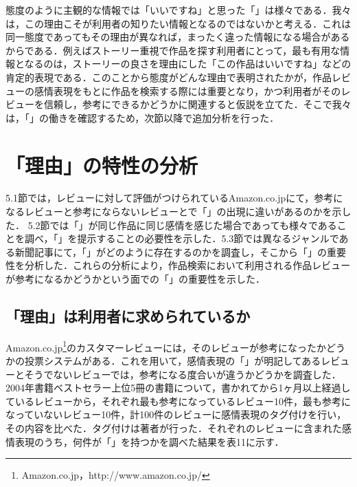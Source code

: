 \documentclass[japanese]{jnlp_1.3a}
\begin{document}
態度のように主観的な情報では「いいですね」と思った「」は様々である．我々は，この理由こそが利用者の知りたい情報となるのではないかと考える．これは同一態度であってもその理由が異なれば，まったく違った情報になる場合があるからである．例えばストーリー重視で作品を探す利用者にとって，最も有用な情報となるのは，ストーリーの良さを理由にした「この作品はいいですね」などの肯定的表現である．このことから態度がどんな理由で表明されたかが，作品レビューの感情表現をもとに作品を検索する際には重要となり，かつ利用者がそのレビューを信頼し，参考にできるかどうかに関連すると仮説を立てた．そこで我々は，「」の働きを確認するため，次節以降で追加分析を行った．

\section{「理由」の特性の分析}

5.1節では，レビューに対して評価がつけられているAmazon.co.jpにて，参考になるレビューと参考にならないレビューとで「」の出現に違いがあるのかを示した． 
5.2節では「」が同じ作品に同じ感情を感じた場合であっても様々であることを調べ，「」を提示することの必要性を示した．5.3節では異なるジャンルである新聞記事にて，「」がどのように存在するのかを調査し，そこから「」の重要性を分析した．これらの分析により，作品検索において利用される作品レビューが参考になるかどうかという面での「」の重要性を示した．

\subsection{「理由」は利用者に求められているか}

Amazon.co.jp\footnote{
	Amazon.co.jp，http://www.amazon.co.jp/}のカスタマーレビューには，そのレビューが参考になったかどうかの投票システムがある．これを用いて，感情表現の「」が明記してあるレビューとそうでないレビューでは，参考になる度合いが違うかどうかを調査した． 
2004年書籍ベストセラー上位5冊の書籍について，書かれてから1ヶ月以上経過しているレビューから，それぞれ最も参考になっているレビュー10件，最も参考になっていないレビュー10件，計100件のレビューに感情表現のタグ付けを行い，その内容を比べた．タグ付けは著者が行った．それぞれのレビューに含まれた感情表現のうち，何件が「」を持つかを調べた結果を表11に示す． 
\end{document}
